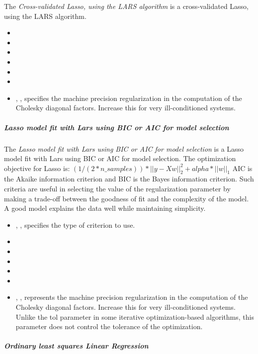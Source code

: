 The \textit{Cross-validated Lasso, using the LARS algorithm} is a
cross-validated Lasso, using the LARS algorithm.


\begin{itemize}
  \item {}
  \item {}
  \item {}
  \item {}
  \item {}
  \item {}
  \item {}, , specifies the machine
  precision regularization in the computation of the Cholesky diagonal factors.
  Increase this for very ill-conditioned systems.
\end{itemize}
\subparagraph{Lasso model fit with Lars using BIC or AIC for model selection}
\mbox{}

The \textit{Lasso model fit with Lars using BIC or AIC for model selection} is
a Lasso model fit with Lars using BIC or AIC for model selection.
The optimization objective for Lasso is:
$(1 / (2 * n\_samples)) * ||y - Xw||^2_2 + alpha * ||w||_1$
AIC is the Akaike information criterion and BIC is the Bayes information
criterion.
%
Such criteria are useful in selecting the value of the regularization parameter
by making a trade-off between the goodness of fit and the complexity of the
model.
%
A good model explains the data well while maintaining simplicity.
%
\begin{itemize}
  \item {}, , specifies the type of
  criterion to use.
  \item {}
  \item {}
  \item {}
  \item {}
  \item {}
  \item {}, , represents the machine
  precision regularization in the computation of the Cholesky diagonal factors.
  Increase this for very ill-conditioned systems.
  Unlike the tol parameter in some iterative optimization-based algorithms, this
  parameter does not control the tolerance of the optimization.
\end{itemize}
\subparagraph{Ordinary least squares Linear Regression}
\mbox{}

